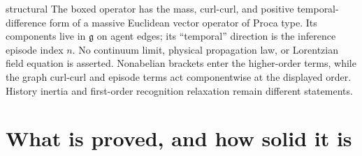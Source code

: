 \begin{analogy}{structural}
The boxed operator has the mass, curl-curl, and positive temporal-difference form of a
massive Euclidean vector operator of Proca type. Its components live in $\mathfrak g$ on
agent edges; its ``temporal'' direction is the inference episode index $n$. No continuum
limit, physical propagation law, or Lorentzian field equation is asserted. Nonabelian
brackets enter the higher-order terms, while the graph curl-curl and episode terms act
componentwise at the displayed order. History inertia and first-order recognition
relaxation remain different statements.
\end{analogy}

\section{What is proved, and how solid it is}
\label{comp:links-status}

